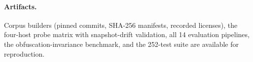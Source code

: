 \documentclass[sigconf,nonacm]{acmart}
\begin{document}
\paragraph{Artifacts.} Corpus builders (pinned commits, SHA-256 manifests, recorded licenses), the four-host probe matrix with snapshot-drift validation, all 14 evaluation pipelines, the obfuscation-invariance benchmark, and the 252-test suite are available for reproduction.



\end{document}
